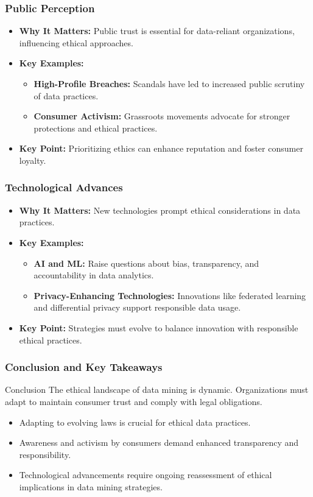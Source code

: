 \documentclass[aspectratio=169]{beamer}
\begin{document}
\begin{frame}[fragile]
    \frametitle{Public Perception}
    \begin{itemize}
        \item \textbf{Why It Matters:} Public trust is essential for data-reliant organizations, influencing ethical approaches.
        \item \textbf{Key Examples:}
        \begin{itemize}
            \item \textbf{High-Profile Breaches:} Scandals have led to increased public scrutiny of data practices.
            \item \textbf{Consumer Activism:} Grassroots movements advocate for stronger protections and ethical practices.
        \end{itemize}
        \item \textbf{Key Point:} Prioritizing ethics can enhance reputation and foster consumer loyalty.
    \end{itemize}
\end{frame}

\begin{frame}[fragile]
    \frametitle{Technological Advances}
    \begin{itemize}
        \item \textbf{Why It Matters:} New technologies prompt ethical considerations in data practices.
        \item \textbf{Key Examples:}
        \begin{itemize}
            \item \textbf{AI and ML:} Raise questions about bias, transparency, and accountability in data analytics.
            \item \textbf{Privacy-Enhancing Technologies:} Innovations like federated learning and differential privacy support responsible data usage.
        \end{itemize}
        \item \textbf{Key Point:} Strategies must evolve to balance innovation with responsible ethical practices.
    \end{itemize}
\end{frame}

\begin{frame}[fragile]
    \frametitle{Conclusion and Key Takeaways}
    \begin{block}{Conclusion}
        The ethical landscape of data mining is dynamic. Organizations must adapt to maintain consumer trust and comply with legal obligations.
    \end{block}
    \begin{itemize}
        \item Adapting to evolving laws is crucial for ethical data practices.
        \item Awareness and activism by consumers demand enhanced transparency and responsibility.
        \item Technological advancements require ongoing reassessment of ethical implications in data mining strategies.
    \end{itemize}
\end{frame}
\end{document}
